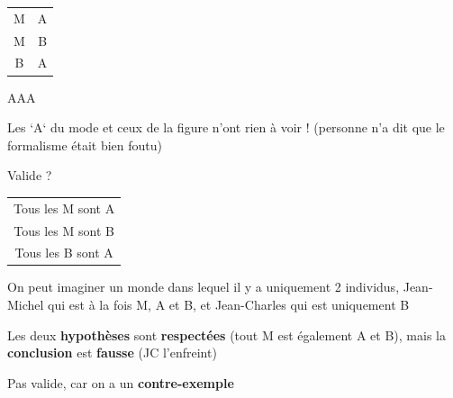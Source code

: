 \begin{frame}
	
	\begin{description}[labelindent=6pt,style=multiline,leftmargin=1.3in]
		 \setlength\itemsep{1em}

\item[$3^{\grave{e}me}$ figure] \begin{tabular}{cc}
M & A \\
	M & B \\
\cline{1-2}
		B & A \\
\end{tabular}
\item[Mode] AAA \pause
\item[Attention] Les `A` du mode et ceux de la figure n'ont rien à voir ! \pause (personne n'a dit que le formalisme était bien foutu) \pause
\item[Question] Valide ? 

	\end{description} 
\end{frame}



\begin{frame}
	
	\begin{description}[labelindent=6pt,style=multiline,leftmargin=1.3in]
		 \setlength\itemsep{1em}

\item[Mode + figure] \begin{tabular}{c}
Tous les M sont A\\ 
Tous les M sont B\\ 
\cline{1-1}
Tous les B sont A
\end{tabular} \pause
\item[Explication] On peut imaginer un monde dans lequel il y a uniquement 2 individus, Jean-Michel qui est à la fois M, A et B, et Jean-Charles qui est uniquement B \pause
\item[] Les deux \textbf{hypothèses} sont \textbf{respectées} (tout M est également A et B), mais la \textbf{conclusion} est \textbf{fausse} (JC l'enfreint)\pause
\item[Réponse] Pas valide, car on a un \textbf{contre-exemple} 

	\end{description} 
\end{frame}


